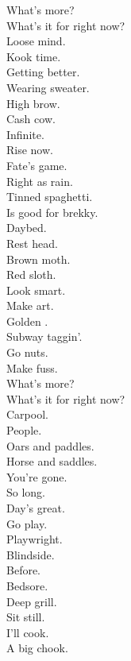 What's more? \\
What's it for right now? \\

Loose mind. \\
Kook time. \\
Getting better. \\
Wearing sweater. \\
High brow. \\
Cash cow. \\
Infinite. \\
Rise now. \\

Fate's game. \\
Right as rain. \\
Tinned spaghetti. \\
Is good for brekky. \\
Daybed. \\
Rest head. \\
Brown moth. \\
Red sloth. \\

Look smart. \\
Make art. \\
Golden . \\
Subway taggin'. \\
Go nuts. \\
Make fuss. \\

What's more? \\
What's it for right now? \\

Carpool. \\
People. \\
Oars and paddles. \\
Horse and saddles. \\
You're gone. \\
So long. \\
Day's great. \\
Go play. \\

Playwright. \\
Blindside. \\
Before. \\
Bedsore. \\
Deep grill. \\
Sit still. \\
I'll cook. \\
A big chook. \\

